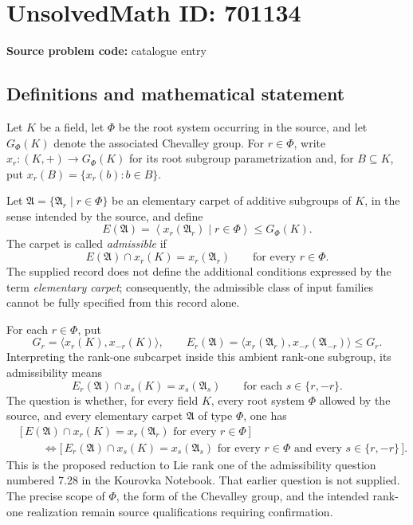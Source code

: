 \documentclass[11pt]{article}
\begin{document}
\section*{UnsolvedMath ID: 701134}
\textbf{Source problem code:} catalogue entry
\subsection{Definitions and mathematical statement}
Let \(K\) be a field, let \(\Phi\) be the root system occurring in the source, and let \(G_\Phi(K)\) denote the associated Chevalley group. For \(r\in\Phi\), write \(x_r: (K,+)\to G_\Phi(K)\) for its root subgroup parametrization and, for \(B\subseteq K\), put \(x_r(B)=\{x_r(b):b\in B\}\).

Let \(\mathfrak A=\{\mathfrak A_r\mid r\in\Phi\}\) be an elementary carpet of additive subgroups of \(K\), in the sense intended by the source, and define
\[
E(\mathfrak A)=\left\langle x_r(\mathfrak A_r)\mid r\in\Phi\right\rangle\leq G_\Phi(K).
\]
The carpet is called \emph{admissible} if
\[
E(\mathfrak A)\cap x_r(K)=x_r(\mathfrak A_r)
\qquad\text{for every }r\in\Phi.
\]
The supplied record does not define the additional conditions expressed by the term \emph{elementary carpet}; consequently, the admissible class of input families cannot be fully specified from this record alone.

For each \(r\in\Phi\), put
\[
G_r=\langle x_r(K),x_{-r}(K)\rangle,
\qquad
E_r(\mathfrak A)=\langle x_r(\mathfrak A_r),x_{-r}(\mathfrak A_{-r})\rangle\leq G_r.
\]
Interpreting the rank-one subcarpet inside this ambient rank-one subgroup, its admissibility means
\[
E_r(\mathfrak A)\cap x_s(K)=x_s(\mathfrak A_s)
\qquad\text{for each }s\in\{r,-r\}.
\]
The question is whether, for every field \(K\), every root system \(\Phi\) allowed by the source, and every elementary carpet \(\mathfrak A\) of type \(\Phi\), one has
\[
\begin{aligned}
&\bigl[\,E(\mathfrak A)\cap x_r(K)=x_r(\mathfrak A_r)
       \text{ for every }r\in\Phi\,\bigr]\\
&\qquad\Longleftrightarrow
\bigl[\,E_r(\mathfrak A)\cap x_s(K)=x_s(\mathfrak A_s)
       \text{ for every }r\in\Phi\text{ and every }s\in\{r,-r\}\,\bigr].
\end{aligned}
\]
This is the proposed reduction to Lie rank one of the admissibility question numbered 7.28 in the Kourovka Notebook. That earlier question is not supplied. The precise scope of \(\Phi\), the form of the Chevalley group, and the intended rank-one realization remain source qualifications requiring confirmation.
\end{document}
